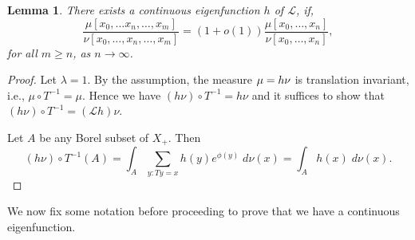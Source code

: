 \documentclass[11pt, a4paper]{amsart}
\newtheorem{lem}[thm]{Lemma}
\theoremstyle{definition}
\theoremstyle{remark}
\begin{document}
\begin{lem}
  There exists a continuous eigenfunction $h$ of ${\mathcal L}$, if, 
$$\frac{\mu[x_0,\ldots x_n, \ldots, x_m]}{\nu[x_0,\ldots, x_n, \ldots, x_m]}=(1+o(1)) \frac{\mu[x_0,\ldots, x_n]}{\nu[x_0, \ldots, x_n]},$$
for all $m\geq n$, as $n\to \infty$.
\end{lem}
\begin{proof}
  Let $\lambda=1$. By the assumption, the measure $\mu= h \nu$ is translation
  invariant, i.e., $\mu\circ T^{-1}=\mu$. Hence we have $(h\nu)\circ
  T^{-1}=h\nu$ and it suffices to show that $(h\nu)\circ T^{-1}=({\mathcal
    L}h)\nu$.

  Let $A$ be any Borel subset of $X_+$. Then
  $$(h\nu)\circ T^{-1} (A)=\int_A \sum_{y: Ty=x} h(y)e^{\phi(y)}\; d\nu(x)=\int_A h(x)\; d\nu(x).$$
\end{proof}

\noindent
We now fix some notation before proceeding to prove that we have a continuous eigenfunction.
\newline
\end{document}
